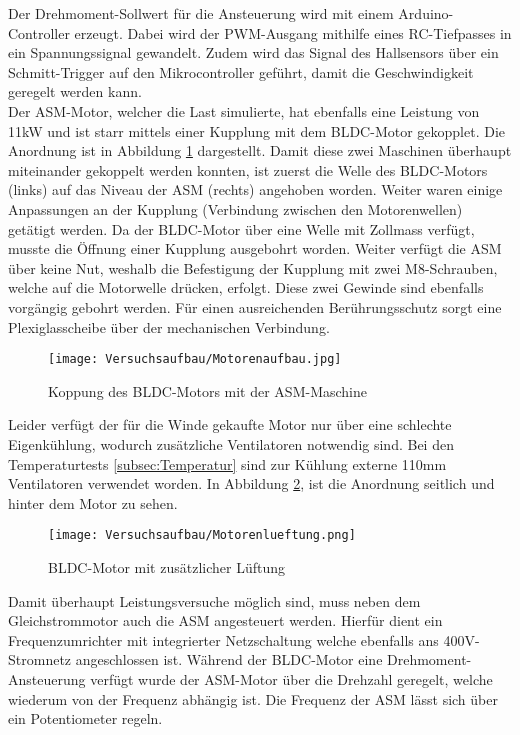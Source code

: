 Der Drehmoment-Sollwert für die Ansteuerung wird mit einem Arduino-Controller erzeugt. Dabei wird der PWM-Ausgang mithilfe eines RC-Tiefpasses in ein Spannungssignal gewandelt. Zudem wird das Signal des Hallsensors über ein Schmitt-Trigger auf den Mikrocontroller geführt, damit die Geschwindigkeit geregelt werden kann.\\
Der ASM-Motor, welcher die Last simulierte, hat ebenfalls eine Leistung von 11kW und ist starr mittels einer Kupplung mit dem BLDC-Motor gekopplet. Die Anordnung ist in Abbildung \ref{fig:Motorenaufbau} dargestellt. Damit diese zwei Maschinen überhaupt miteinander gekoppelt werden konnten, ist zuerst die Welle des BLDC-Motors (links) auf das Niveau der ASM (rechts) angehoben worden. Weiter waren einige Anpassungen an der Kupplung (Verbindung zwischen den Motorenwellen) getätigt werden. Da der BLDC-Motor über eine Welle mit Zollmass verfügt, musste die Öffnung einer Kupplung ausgebohrt worden. Weiter verfügt die ASM über keine Nut, weshalb die Befestigung der Kupplung mit zwei M8-Schrauben, welche auf die Motorwelle drücken, erfolgt. Diese zwei Gewinde sind ebenfalls vorgängig gebohrt werden. Für einen ausreichenden Berührungsschutz sorgt eine Plexiglasscheibe über der mechanischen Verbindung.

\begin{figure}[H]
	\centering
	\texttt{[image: Versuchsaufbau/Motorenaufbau.jpg]}
	\caption{Koppung des BLDC-Motors mit der ASM-Maschine}
	\label{fig:Motorenaufbau}
\end{figure}

Leider verfügt der für die Winde gekaufte Motor nur über eine schlechte Eigenkühlung, wodurch zusätzliche Ventilatoren notwendig sind. Bei den Temperaturtests \ref{subsec:Temperatur} sind zur Kühlung externe 110mm Ventilatoren verwendet worden. In Abbildung \ref{fig:Motorenlueftung}, ist die Anordnung seitlich und hinter dem Motor zu sehen.



\begin{figure}[H]
	\centering
	\texttt{[image: Versuchsaufbau/Motorenlueftung.png]}
	\caption{BLDC-Motor mit zusätzlicher Lüftung}
	\label{fig:Motorenlueftung}
\end{figure}


Damit überhaupt Leistungsversuche möglich sind, muss neben dem Gleichstrommotor auch die ASM angesteuert werden. Hierfür dient ein Frequenzumrichter mit integrierter Netzschaltung welche ebenfalls ans 400V-Stromnetz angeschlossen ist. Während der BLDC-Motor eine Drehmoment-Ansteuerung verfügt wurde der ASM-Motor über die Drehzahl geregelt, welche wiederum von der Frequenz abhängig ist. Die Frequenz der ASM lässt sich über ein Potentiometer regeln.